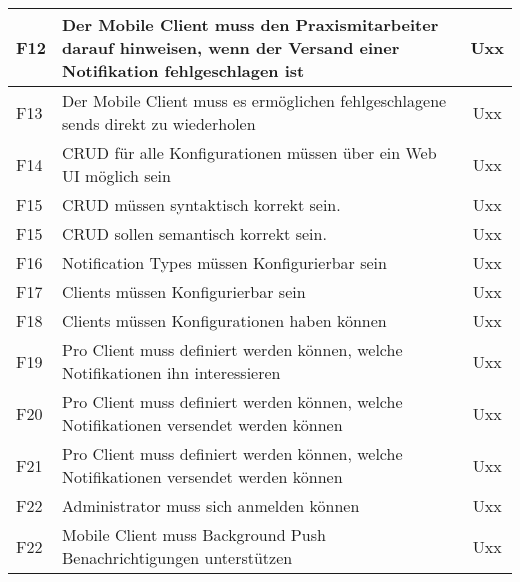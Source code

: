 \begin{table}[h]
\begin{tabular}{|l|p{13cm}|c|}
        \hline
        F12        & Der Mobile Client muss den Praxismitarbeiter darauf hinweisen, wenn der Versand einer Notifikation fehlgeschlagen ist & Uxx \\
        \hline
        F13        & Der Mobile Client muss es ermöglichen fehlgeschlagene sends direkt zu wiederholen & Uxx \\
        \hline
        F14        & CRUD für alle Konfigurationen müssen über ein Web UI möglich sein                                                     & Uxx                 \\
        \hline
        F15        & CRUD müssen syntaktisch korrekt sein.                                                                                 & Uxx                 \\
        \hline
        F15        & CRUD sollen semantisch korrekt sein.                                                                                 & Uxx                 \\
        \hline
        F16        & Notification Types müssen Konfigurierbar sein                                                                         & Uxx                 \\
        \hline
        F17        & Clients müssen Konfigurierbar sein                                                                                    & Uxx                 \\
        \hline
        F18        & Clients müssen Konfigurationen haben können                                                                           & Uxx                 \\
        \hline
        F19        & Pro Client muss definiert werden können, welche Notifikationen ihn interessieren & Uxx \\
        \hline
        F20        & Pro Client muss definiert werden können, welche Notifikationen versendet werden können & Uxx \\
        \hline
        F21        & Pro Client muss definiert werden können, welche Notifikationen versendet werden können & Uxx \\
        \hline
        F22        & Administrator muss sich anmelden können & Uxx \\
        \hline
        F22        & Mobile Client muss Background Push Benachrichtigungen unterstützen & Uxx \\
        \hline

    \end{tabular}\label{tab:features1}
\end{table}


